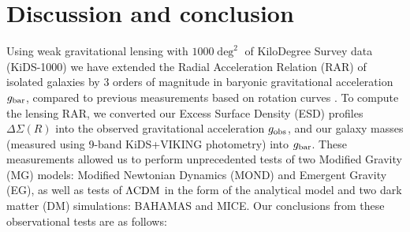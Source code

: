 \documentclass[usenatbib]{mnras}
\newcommand{\lcdm}{{\rm \Lambda CDM}}
\newcommand{\un}[1]{_{\rm #1}}
\begin{document}
\section{Discussion and conclusion}
\label{sec:discon}

Using weak gravitational lensing with $1000 \deg^2$ of KiloDegree Survey data (KiDS-1000) we have extended the Radial Acceleration Relation (RAR) of isolated galaxies by $3$ orders of magnitude in baryonic gravitational acceleration $g\un{bar}$, compared to previous measurements based on rotation curves \cite[most notably][M16]{mcgaugh2016}. To compute the lensing RAR, we converted our Excess Surface Density (ESD) profiles $\Delta\Sigma(R)$ into the observed gravitational acceleration $g\un{obs}$, and our galaxy masses (measured using 9-band KiDS+VIKING photometry) into $g\un{bar}$. These measurements allowed us to perform unprecedented tests of two Modified Gravity (MG) models: Modified Newtonian Dynamics (MOND) and Emergent Gravity (EG), as well as tests of $\lcdm$ in the form of the \cite[][N17]{navarro2017} analytical model and two dark matter (DM) simulations: BAHAMAS and MICE. Our conclusions from these observational tests are as follows:
\end{document}
